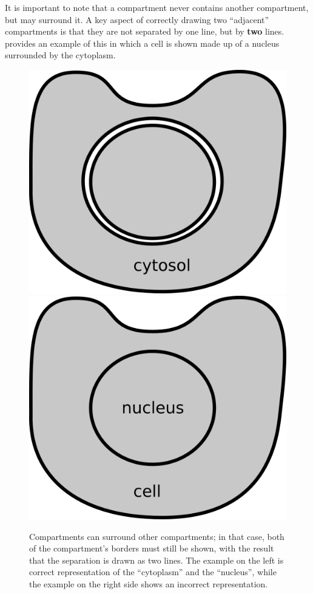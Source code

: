 It is important to note that a compartment never contains another compartment, but may surround it.  A key aspect of correctly drawing two ``adjacent'' compartments is that they are not separated by one line, but by \textbf{two} lines.   provides an example of this in which a cell is shown made up of a nucleus surrounded by the cytoplasm.

\begin{figure}[H]
  \centering
  \includegraphics[scale = 0.4]{examples/compartment-cell.png}
 \includegraphics[scale = 0.4]{examples/compartment-cell-wrong.png}
  \caption{Compartments can surround other compartments; in that case, both of the compartment's borders must still be shown, with the result that the separation is drawn as two lines. The example on the left is correct representation of the ``cytoplasm'' and the ``nucleus'', while the example on the right side shows an incorrect representation. }
  \label{fig:two-comp}
\end{figure}

